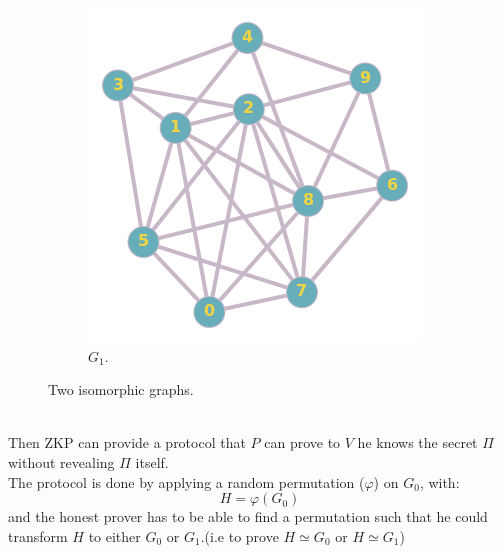 \documentclass[12pt,a4paper]{article}
\begin{document}
\begin{figure}[h!]
\begin{subfigure}[b]{.39\linewidth}
		\includegraphics[width=\linewidth]{ex2_2.png}
		\caption{$G_1$.}
	\end{subfigure}
	\caption{Two isomorphic graphs.}
	\label{fig:Two isomorphic graphs has 10 vertices and 28 edges}
\end{figure}\\
Then ZKP can provide a protocol that $P$ can prove to $V$ he knows the secret $\Pi$ without revealing $\Pi$ itself.\\
The protocol is done by applying a random permutation ($\varphi$) on $G_0$, with: $$H=\varphi(G_0)$$ and the honest prover has to be able to find a permutation such that he could transform $H$ to either $G_0$ or $G_1$.(i.e to prove $H\simeq G_0$ or $H\simeq G_1$)\\
\end{document}
